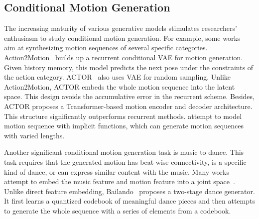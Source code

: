 \subsection{Conditional Motion Generation}\label{sec2_2}
The increasing maturity of various generative models stimulates researchers' enthusiasm to study conditional motion generation. For example, some works~\citep{guo2020action2motion,petrovich2021action,cervantes2022implicit} aim at synthesizing motion sequences of several specific categories. Action2Motion~\citep{guo2020action2motion} builds up a recurrent conditional VAE for motion generation. Given history memory, this model predicts the next pose under the constraints of the action category. ACTOR~\citep{petrovich2021action} also uses VAE for random sampling. Unlike Action2Motion, ACTOR embeds the whole motion sequence into the latent space. This design avoids the accumulative error in the recurrent scheme. Besides, ACTOR proposes a Transformer-based motion encoder and decoder architecture. This structure significantly outperforms recurrent methods. \cite{cervantes2022implicit} attempt to model motion sequence with implicit functions, which can generate motion sequences with varied lengths.

Another significant conditional motion generation task is music to dance. This task requires that the generated motion has beat-wise connectivity, is a specific kind of dance, or can express similar content with the music. Many works attempt to embed the music feature and motion feature into a joint space~\citep{lee2019dancing, sun2020deepdance, li2020learning, li2021ai}. Unlike direct feature embedding, Bailando~\citep{siyao2022bailando} proposes a two-stage dance generator. It first learns a quantized codebook of meaningful dance pieces and then attempts to generate the whole sequence with a series of elements from a codebook.

